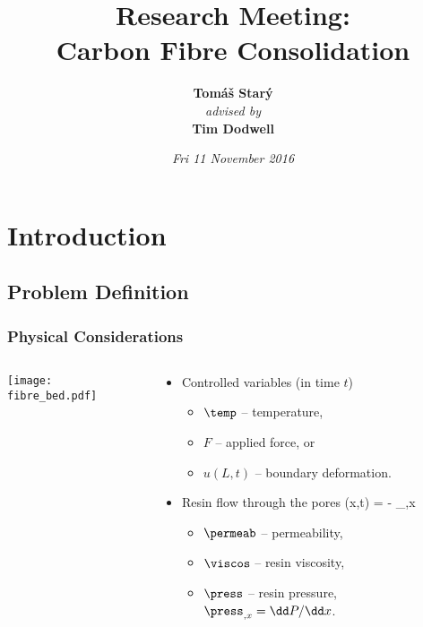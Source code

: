\documentclass[compress]{beamer}%
\institute{\footnotesize 
  College of Engineering, Mathematics and Physical Sciences
}
\title{Research Meeting:\\ Carbon Fibre Consolidation}
\author{ \textbf{\Large Tom\'a\v s Star\'y} \\ {\footnotesize\it advised by} \\[1ex] \textbf{\Large Tim Dodwell}
}
\date{
\it  Fri 11 November 2016
}
\newcommand{\eqcolor}{blue}
\newenvironment{myalign}
{\align\color{\eqcolor}}
{
  \nonumber
  \endalign
  \vspace{-1em}
}
\begin{document}
 
\frame{\titlepage}

\section[Outline]{}
\frame{\tableofcontents}


\section{Introduction}

\subsection{Problem Definition}

\begin{frame}[label=A]
  \frametitle{Physical Considerations}
  \begin{columns}
    \begin{column}{0.4\textwidth}
      \texttt{[image: fibre\_bed.pdf]}
    \end{column}
    \begin{column}{0.6\textwidth}
      \begin{itemize}
      \item Controlled variables (in time $t$)
        \begin{itemize}
        \item $\temp$ -- temperature,
        \item $F$ -- applied force, or
        \item $u(L,t)$ -- boundary deformation.
        \end{itemize}
        
      \item Resin flow through the pores
        \begin{myalign}
          \flow(x,t) = - \press_{,x} 
        \end{myalign}
        \begin{itemize}
        \item $\permeab$ -- permeability,
        \item $\viscos$ -- resin viscosity,
        \item $\press$ -- resin pressure, $\press_{,x}= \dd P/\dd x$.
        \end{itemize}


\end{itemize}
\end{column}
\end{columns}
\end{frame}
\end{document}
